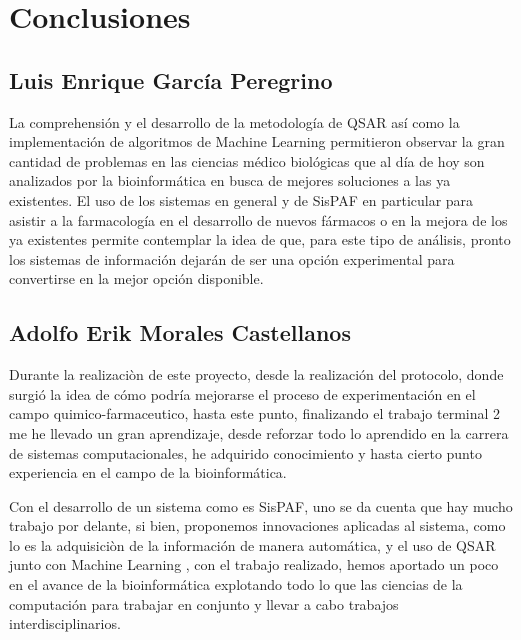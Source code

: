 \rhead{\newtitle}
\cfoot{\thepage}
\renewcommand{\headrulewidth}{1pt}
\renewcommand{\footrulewidth}{1pt}

\chapter{Conclusiones}\label{ch_6}


\section{Luis Enrique García Peregrino}{
\noindent La comprehensión y el desarrollo de la metodología de QSAR así como la implementación de algoritmos de Machine Learning permitieron observar la gran cantidad de problemas en las ciencias médico biológicas que al día de hoy son analizados por la bioinformática en busca de mejores soluciones a las ya existentes. El uso de los sistemas en general y de SisPAF en particular para asistir a la farmacología en el desarrollo de nuevos fármacos o en la mejora de los ya existentes permite contemplar la idea de que, para este tipo de análisis, pronto los sistemas de información dejarán de ser una opción experimental para convertirse en la mejor opción disponible.
}

\section{Adolfo Erik Morales Castellanos}{
\noindent Durante la realizaciòn de este proyecto, desde la realización del protocolo, donde surgió la idea de cómo podría mejorarse el proceso de experimentación en el campo quimico-farmaceutico, hasta este punto, finalizando el trabajo terminal 2 me he llevado un gran aprendizaje, desde reforzar todo lo aprendido en la carrera de sistemas computacionales, he adquirido conocimiento y hasta cierto punto experiencia en el campo de la  bioinformática.

\noindent Con el desarrollo de un sistema como es  SisPAF, uno se da cuenta que hay mucho trabajo por delante, si bien, proponemos innovaciones aplicadas al sistema, como lo es la adquisiciòn de la información de manera automática, y el uso de QSAR junto con Machine Learning , con el trabajo realizado, hemos aportado un poco en el avance de la bioinformática explotando todo lo que las ciencias de la computación para trabajar en conjunto y llevar a cabo trabajos interdisciplinarios.
}

